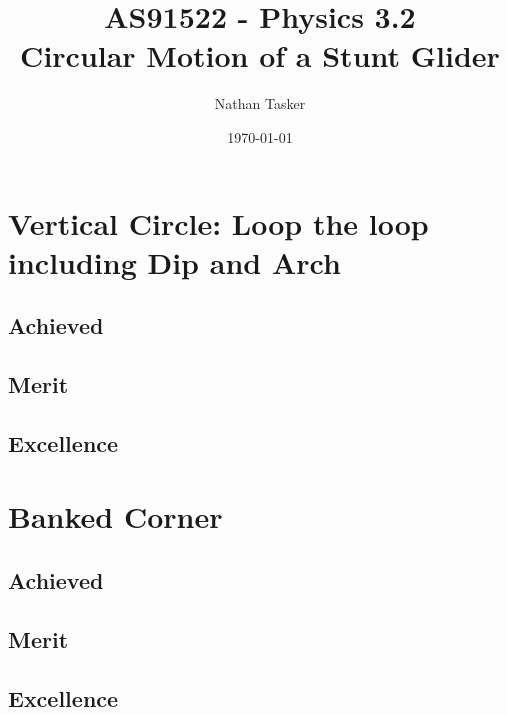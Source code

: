 \documentclass[11pt, a4paper]{article}
\title{\small AS91522 - Physics 3.2\\ \huge Circular Motion of a Stunt Glider}
\author{Nathan Tasker}
\date{\today}
\begin{document}
	\maketitle
	\tableofcontents
	\section{Vertical Circle: Loop the loop including Dip and Arch}
	\subsection{Achieved}
	\subsection{Merit}
	\subsection{Excellence}
	\section{Banked Corner}
	\subsection{Achieved}
	\subsection{Merit}
	\subsection{Excellence}
\end{document}

